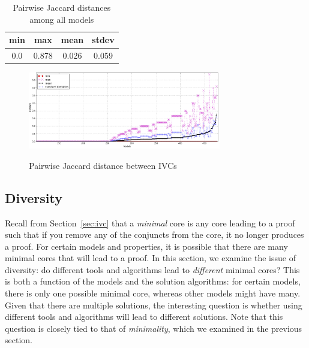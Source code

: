 \begin{table}
  \centering
  \begin{tabular}{ |c|c|c|c| }
    \hline
     min & max & mean & stdev \\[0.5ex]
    \hline
     0.0   & 0.878 & 0.026 & 0.059 \\[0.5ex]
    \hline
  \end{tabular}
  \caption{Pairwise Jaccard distances among all models}
  \label{tab:jaccard-avg}
\end{table}

\begin{figure}
  \centering
  \includegraphics[width=0.75\textwidth]{figs/jacdis2.png} \\
  \vspace{-0.1in}
  \caption{Pairwise Jaccard distance between IVCs}\label{fig:jacdis}
\end{figure}

\subsection{Diversity}
\label{sec:diversity}


Recall from Section~\ref{sec:ivc} that a {\em minimal} core is any
core leading to a proof such that if you remove any of the conjuncts
from the core, it no longer produces a proof. For certain models and
properties, it is possible that there are many minimal cores that will
lead to a proof. In this section, we examine the issue of diversity:
do different tools and algorithms lead to {\em different} minimal
cores? This is both a function of the models and the solution
algorithms: for certain models, there is only one possible minimal
core, whereas other models might have many. Given that there are
multiple solutions, the interesting question is whether using
different tools and algorithms will lead to different solutions. Note
that this question is closely tied to that of {\em minimality}, which
we examined in the previous section.

